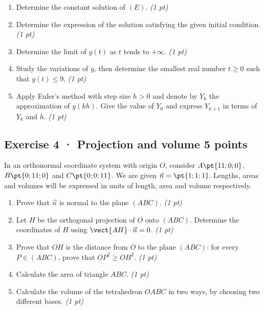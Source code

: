 \begin{enumerate}

\item Determine the constant solution of $(E)$. \hfill\textit{(1 pt)}

\item Determine the expression of the solution satisfying the given initial condition. \hfill\textit{(1 pt)}

\item Determine the limit of $y(t)$ as $t$ tends to $+\infty$. \hfill\textit{(1 pt)}

\item Study the variations of $y$, then determine the smallest real number $t\ge0$ such that $y(t)\le9$. \hfill\textit{(1 pt)}

\item Apply Euler's method with step size $h>0$ and denote by $Y_k$ the approximation of $y(kh)$. Give the value of $Y_0$ and express $Y_{k+1}$ in terms of $Y_k$ and $h$. \hfill\textit{(1 pt)}

\end{enumerate}

\subsection*{Exercise 4 · Projection and volume \hfill 5 points}In an orthonormal coordinate system with origin $O$, consider $A\pt{11;0;0}$, $B\pt{0;11;0}$ and $C\pt{0;0;11}$. We are given $\vec n=\pt{1;1;1}$. Lengths, areas and volumes will be expressed in units of length, area and volume respectively.

\begin{enumerate}

\item Prove that $\vec n$ is normal to the plane $(ABC)$. \hfill\textit{(1 pt)}

\item Let $H$ be the orthogonal projection of $O$ onto $(ABC)$. Determine the coordinates of $H$ using $\vect{AH}\cdot\vec n=0$. \hfill\textit{(1 pt)}

\item Prove that $OH$ is the distance from $O$ to the plane $(ABC)$: for every $P\in(ABC)$, prove that $OP^2\ge OH^2$. \hfill\textit{(1 pt)}

\item Calculate the area of triangle $ABC$. \hfill\textit{(1 pt)}

\item Calculate the volume of the tetrahedron $OABC$ in two ways, by choosing two different bases. \hfill\textit{(1 pt)}

\end{enumerate}

